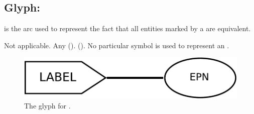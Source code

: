 \subsection{Glyph:  }\label{sec:equivalenceArc}

 is the arc used to represent the fact that all entities
marked by a  are equivalent. 

\begin{glyphDescription}
 \glyphSboTerm Not applicable.
 \glyphOrigin Any  ().
 \glyphTarget {} ().
 \glyphEndPoint No particular symbol is used to represent an .
 \end{glyphDescription}

\begin{figure}[H]
  \centering
  \includegraphics[scale = 0.4]{images/equivalence}
  \caption{The \PD glyph for .}
  \label{fig:equivalence}
\end{figure}
